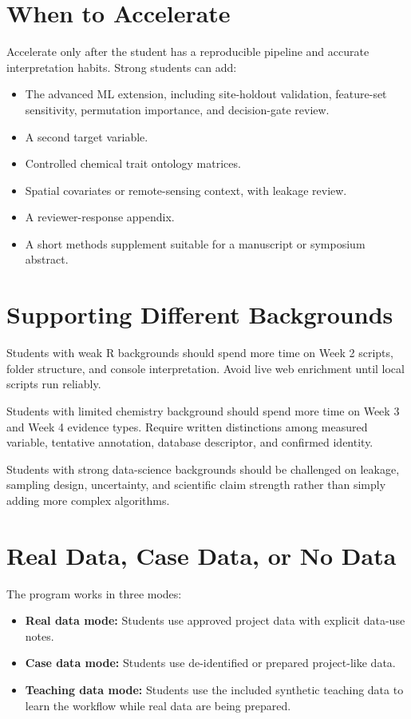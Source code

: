 \section{When to Accelerate}

Accelerate only after the student has a reproducible pipeline and accurate interpretation habits. Strong students can add:
\begin{itemize}
  \item The advanced ML extension, including site-holdout validation, feature-set sensitivity, permutation importance, and decision-gate review.
  \item A second target variable.
  \item Controlled chemical trait ontology matrices.
  \item Spatial covariates or remote-sensing context, with leakage review.
  \item A reviewer-response appendix.
  \item A short methods supplement suitable for a manuscript or symposium abstract.
\end{itemize}

\section{Supporting Different Backgrounds}

Students with weak R backgrounds should spend more time on Week 2 scripts, folder structure, and console interpretation. Avoid live web enrichment until local scripts run reliably.

Students with limited chemistry background should spend more time on Week 3 and Week 4 evidence types. Require written distinctions among measured variable, tentative annotation, database descriptor, and confirmed identity.

Students with strong data-science backgrounds should be challenged on leakage, sampling design, uncertainty, and scientific claim strength rather than simply adding more complex algorithms.

\section{Real Data, Case Data, or No Data}

The program works in three modes:
\begin{itemize}
  \item \textbf{Real data mode:} Students use approved project data with explicit data-use notes.
  \item \textbf{Case data mode:} Students use de-identified or prepared project-like data.
  \item \textbf{Teaching data mode:} Students use the included synthetic teaching data to learn the workflow while real data are being prepared.
\end{itemize}

